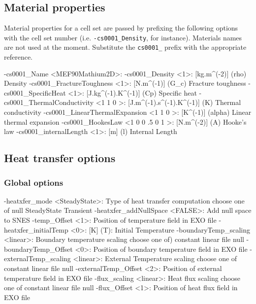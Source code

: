 \documentclass[10pt,oneside]{memoir}
\begin{document}
\subsection{Material properties}
Material properties for a cell set are passed by prefixing the following options with the cell set number (i.e. \verb+-cs0001_Density+, for instance). Materials names are not used at the moment. Substitute the \verb+cs0001_+ prefix with the appropriate reference.
\small{
\begin{boxedverbatim}
-cs0001_Name <MEF90Mathium2D>:  
-cs0001_Density <1>: [kg.m^(-2)] (rho) Density 
-cs0001_FractureToughness <1>: [N.m^(-1)] (G_c) Fracture toughness 
-cs0001_SpecificHeat <1>: [J.kg^(-1).K^(-1)] (Cp) Specific heat 
-cs0001_ThermalConductivity <1 1 0 >: [J.m^(-1).s^(-1).K^(-1)] (K) Thermal conductivity 
-cs0001_LinearThermalExpansion <1 1 0 >: [K^(-1)] (alpha) Linear thermal expansion  
-cs0001_HookesLaw <1 0 0 .5 0 1 >: [N.m^(-2)] (A) Hooke's law 
-cs0001_internalLength <1>: [m] (l) Internal Length 
\end{boxedverbatim}
}

\subsection{Heat transfer options}
\subsubsection{Global options}
\small{\begin{boxedverbatim}
-heatxfer_mode <SteadyState>:   Type of heat transfer computation 
                                choose one of null SteadyState Transient
-heatxfer_addNullSpace <FALSE>: Add null space to SNES 
-temp_Offset <1>:               Position of temperature field in EXO file 
-heatxfer_initialTemp <0>:      [K] (T): Initial Temperature 
-boundaryTemp_scaling <linear>: Boundary temperature scaling 
                                choose one of)  constant linear file null
-boundaryTemp_Offset <0>:       Position of boundary temperature field in EXO file 
-externalTemp_scaling <linear>: External Temperature scaling 
                                choose one of constant linear file null
-externalTemp_Offset <2>:       Position of external temperature field in EXO file 
-flux_scaling <linear>:         Heat flux scaling 
                                choose one of constant linear file null
-flux_Offset <1>:               Position of heat flux field in EXO file 
\end{boxedverbatim}}
\end{document}
